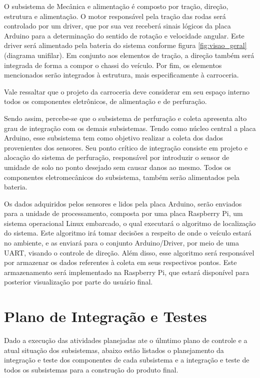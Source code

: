 
O subsistema de Mecânica e alimentação é composto por tração, direção, estrutura e alimentação. O motor
responsável pela tração das rodas será controlado por um driver, que por sua vez receberá sinais lógicos da placa Arduino
para a determinação do sentido de rotação e velocidade angular. Este driver será alimentado pela bateria do sistema conforme
figura \ref{fig:visao_geral} (diagrama unifilar). Em conjunto aos elementos de tração, a direção também será integrada de forma
a compor o chassi do veículo. Por fim, os elementos mencionados serão integrados à estrutura, mais especificamente à carroceria.

Vale ressaltar que o projeto da carroceria deve considerar em seu espaço interno todos os componentes eletrônicos, de
alimentação e de perfuração.

Sendo assim, percebe-se que o subsistema de perfuração e coleta apresenta alto grau de integração com os demais subsistemas.
Tendo como núcleo central a placa Arduino, esse subsistema tem como objetivo realizar a coleta dos dados provenientes dos
sensores. Seu ponto crítico de integração consiste em projeto e alocação do sistema de perfuração, responsável por introduzir
o sensor de umidade de solo no ponto desejado sem causar danos ao mesmo. Todos os componentes eletromecânicos do subsistema,
também serão alimentados pela bateria.


Os dados adquiridos pelos sensores e lidos pela placa Arduino, serão enviados para a unidade de processamento, composta por
uma placa Raspberry Pi, um sistema operacional Linux embarcado, o qual executará o algoritmo de localização do sistema. Este
algoritmo irá tomar decisões a respeito de onde o veículo estará no ambiente, e as enviará para o conjunto Arduino/Driver, por meio de uma UART, visando o controle de
direção. Além disso, esse algoritmo será responsável por armazenar os dados referentes à coleta em seus respectivos
pontos. Este armazenamento será implementado na Raspberry Pi, que estará disponível para posterior visualização por
parte do usuário final.

\chapter{Plano de Integração e Testes}

Dado a execução das atividades planejadas ate o úlmtimo plano de controle e a atual situação dos subsistemas, abaixo estão listados o planejamento da integração e teste dos componentes de cada subsistema e a integração e teste de todos os subsistemas para a construção do produto final.

